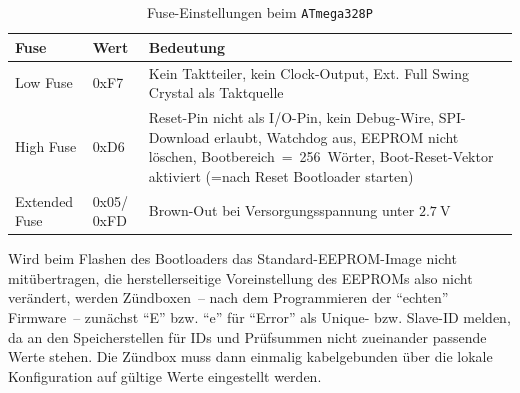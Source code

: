 \documentclass[paper=a4, parskip, numbers=noenddot, toc=listof, headsepline]{scrbook}
\begin{document}
			\begin{table}
				\centering
				\begin{tabu}
					to .9\textwidth {lX[1,l]X[-7,l]}
					\hline\hline
					\textbf{Fuse} & \textbf{Wert}     & \textbf{Bedeutung}                                                                                                                                                                             \\ \hline
					Low Fuse      & 0xF7              & Kein Taktteiler, kein Clock-Output, Ext. Full Swing Crystal als Taktquelle                                                                                                                     \\
					High Fuse     & 0xD6              & Reset-Pin nicht als I/O-Pin, kein Debug-Wire, SPI-Download erlaubt, Watchdog aus, EEPROM nicht löschen, Bootbereich~=~256~Wörter, Boot-Reset-Vektor aktiviert (=nach Reset Bootloader starten) \\
					Extended Fuse & 0x05/ 0xFD\footnotemark & Brown-Out bei Versorgungsspannung unter $\SI{2,7}{\volt}$                                                                                                                                      \\ \hline\hline
				\end{tabu}
				\caption{Fuse-Einstellungen beim \texttt{ATmega328P}}
				\label{tab:fuses}
			\end{table}

			Wird beim Flashen des Bootloaders das Standard-EEPROM-Image nicht mitübertragen, die herstellerseitige Voreinstellung des EEPROMs also nicht verändert, werden Zündboxen~-- nach dem Programmieren der \enquote{echten} Firmware~-- zunächst \enquote{E} bzw. \enquote{e} für \enquote{Error} als Unique- bzw. Slave-ID melden, da an den Speicherstellen für IDs und Prüfsummen nicht zueinander passende Werte stehen. Die Zündbox muss dann einmalig kabelgebunden über die lokale Konfiguration auf gültige Werte eingestellt werden.
\end{document}
